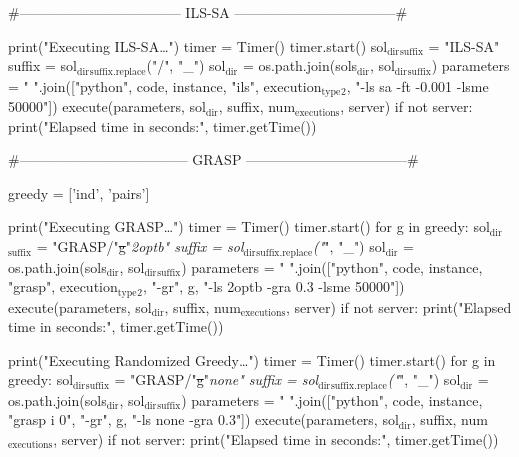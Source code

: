 \documentclass[11pt]{article}
\begin{document}
\#----------------------------------- ILS-SA -----------------------------------\#

print("Executing ILS-SA\ldots{}")
timer = Timer()
timer.start()
sol\(_{\text{dir}}\)\(_{\text{suffix}}\) = "ILS-SA"
suffix = sol\(_{\text{dir}}\)\(_{\text{suffix.replace}}\)("/", "\_")
sol\(_{\text{dir}}\) = os.path.join(sols\(_{\text{dir}}\), sol\(_{\text{dir}}\)\(_{\text{suffix}}\))
parameters = " ".join(["python", code, instance, "ils", execution\(_{\text{type}}\)\(_{\text{2}}\),
                        "-ls sa -ft -0.001 -lsme 50000"])
execute(parameters, sol\(_{\text{dir}}\), suffix, num\(_{\text{executions}}\), server)
if not server:
    print("Elapsed time in seconds:", timer.getTime())

\#------------------------------------ GRASP -----------------------------------\#

greedy = ['ind', 'pairs']

print("Executing GRASP\ldots{}")
timer = Timer()
timer.start()
for g in greedy:
    sol\(_{\text{dir}}\)\(_{\text{suffix}}\) = "GRASP/"\sout{g}"\emph{2optb"
    suffix = sol\(_{\text{dir}}\)\(_{\text{suffix.replace}}\)("}", "\_")
    sol\(_{\text{dir}}\) = os.path.join(sols\(_{\text{dir}}\), sol\(_{\text{dir}}\)\(_{\text{suffix}}\))
    parameters = " ".join(["python", code, instance, "grasp", execution\(_{\text{type}}\)\(_{\text{2}}\),
                           "-gr", g, "-ls 2optb -gra 0.3 -lsme 50000"])
    execute(parameters, sol\(_{\text{dir}}\), suffix, num\(_{\text{executions}}\), server)
if not server:
    print("Elapsed time in seconds:", timer.getTime())

print("Executing Randomized Greedy\ldots{}")
timer = Timer()
timer.start()
for g in greedy:
    sol\(_{\text{dir}}\)\(_{\text{suffix}}\) = "GRASP/"\sout{g}"\emph{none"
    suffix = sol\(_{\text{dir}}\)\(_{\text{suffix.replace}}\)("}", "\_")
    sol\(_{\text{dir}}\) = os.path.join(sols\(_{\text{dir}}\), sol\(_{\text{dir}}\)\(_{\text{suffix}}\))
    parameters = " ".join(["python", code, instance, "grasp i 0",
                            "-gr", g, "-ls none -gra 0.3"])
    execute(parameters, sol\(_{\text{dir}}\), suffix, num\(_{\text{executions}}\), server)
if not server:
    print("Elapsed time in seconds:", timer.getTime())
\end{document}
